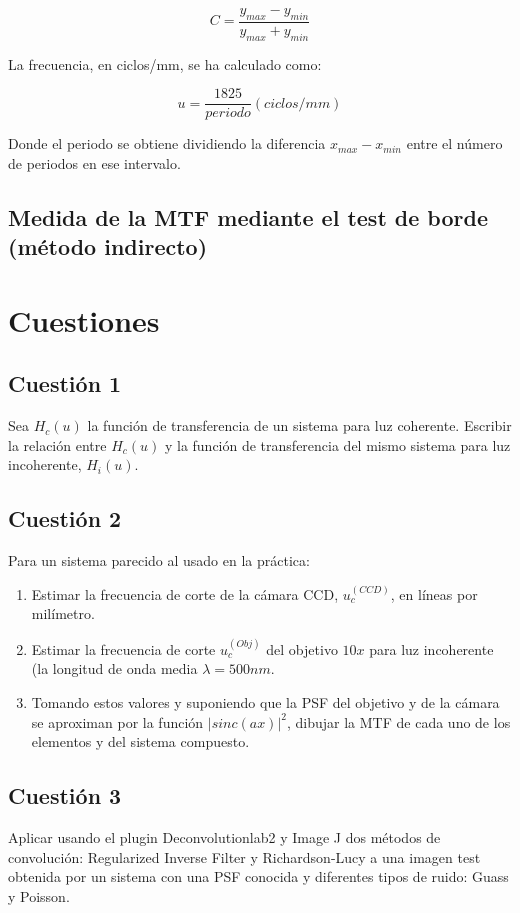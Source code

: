\documentclass[12pt,a5paper]{article}
\begin{document}
\begin{equation}
        C = \frac{y_{max} - y_{min}}{y_{max} + y_{min}}
    \label{contraste}
\end{equation}

La frecuencia, en ciclos/mm, se ha calculado como:

\begin{equation}
        u = \frac{1825}{periodo} (ciclos/mm)
    \label{frecuencia}
\end{equation}

Donde el periodo se obtiene dividiendo la diferencia $x_{max} - x_{min}$ entre el número de periodos en ese intervalo.



\subsection{Medida de la MTF mediante el test de borde (método indirecto)}






\newpage

\section{Cuestiones}

\subsection{Cuestión 1}
Sea $H_{c}(u)$ la función de transferencia de un sistema para luz coherente. Escribir la relación entre $H_{c}(u)$ y la función de transferencia del mismo sistema para luz incoherente, $H_{i}(u)$.


\subsection{Cuestión 2}
Para un sistema parecido al usado en la práctica:
\begin{enumerate}
    \item Estimar la frecuencia de corte de la cámara CCD, $u_{c}^{(CCD)}$, en líneas por milímetro.
    
    \item Estimar la frecuencia de corte $u_{c}^{(Obj)}$ del objetivo $10x$ para luz incoherente (la longitud de onda media $\lambda=500nm$.
    
    \item Tomando estos valores y suponiendo que la PSF del objetivo y de la cámara se aproximan por la función $|sinc(ax)|^2$, dibujar la MTF de cada uno de los elementos y del sistema compuesto.
\end{enumerate}


\subsection{Cuestión 3}
Aplicar usando el plugin Deconvolutionlab2 y Image J dos métodos de convolución: Regularized Inverse Filter y Richardson-Lucy a una imagen test obtenida por un sistema con una PSF conocida y diferentes tipos de ruido: Guass y Poisson.
\end{document}

